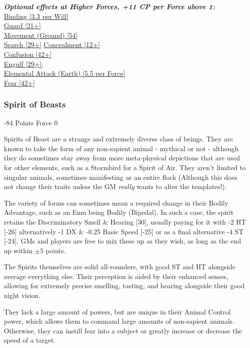 \begin{multicols*}{3}
	\textbf{\textit{Optional effects at Higher Forces, +11 CP per Force above 1:\\}}	
	\hyperref[binding]{Binding [3.3 per Will]}\\
	\hyperref[guard]{Guard [21+]}\\
	\hyperref[movement]{Movement (Ground) [54]}\\
	\hyperref[search]{Search [29+]}	
	\hyperref[concealment]{Concealment [12+]}\\
	\hyperref[confusion]{Confusion [42+]}\\
	\hyperref[engulf]{Engulf [29+];}\\
	\hyperref[elemental_attack]{Elemental Attack (Earth) [5.5 per Force]}\\
	\hyperref[fear]{Fear [42+]}\\
	
	\subsubsection{Spirit of Beasts}
	\begin{flushright}
		-84 Points Force 0
	\end{flushright}
	
	Spirits of Beast are a strange and extremely diverse class of beings. They are known to take the form of any non-sapient animal - mythical or not - although they do sometimes stay away from more meta-physical depictions that are used for other elements, such as a Stormbird for a Spirit of Air. They aren't limited to singular animals, sometimes manifesting as an entire flock (Although this does not change their traits unless the GM \textit{really }wants to alter the templates!).
	
	The variety of forms can sometimes mean a required change in their Bodily Advantage, such as an Emu being Bodily (Bipedal). In such a case, the spirit retains the Discriminatory Smell \& Hearing [30], usually paying for it with -2 HT [-26] alternatively -1 DX \& -0.25 Basic Speed [-25] or as a final alternative -4 ST [-24]. GMs and players are free to mix these up as they wish, as long as the end up within \(\pm5\) points.
	
	The Spirits themselves are solid all-rounders, with good ST and HT alongside average everything else. Their perception is aided by their enhanced senses, allowing for extremely precise smelling, tasting, and hearing alongside their good night vision.
	
	They lack a large amount of powers, but are unique in their Animal Control power, which allows them to command large amounts of non-sapient animals. Otherwise, they can instill fear into a subject or greatly increase or decrease the speed of a target. 
	

\end{multicols*}
